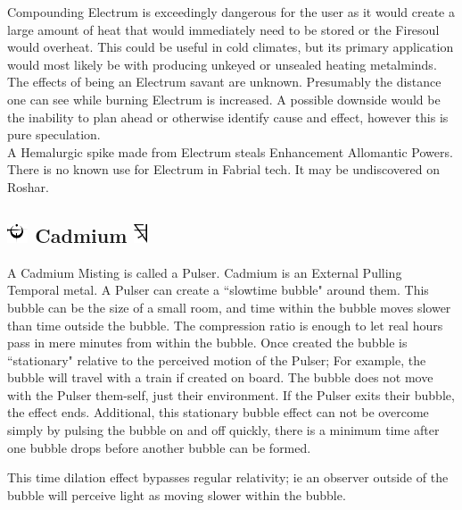 \documentclass[conference]{IEEEtran}
\begin{document}
Compounding Electrum is exceedingly dangerous for the user as it would create a large amount of heat that would immediately need to be stored or the Firesoul would overheat.\cite{fire-pound}  This could be useful in cold climates, but its primary application would most likely be with producing unkeyed or unsealed heating metalminds.\\

The effects of being an Electrum savant are unknown.  Presumably the distance one can see while burning Electrum is increased.  A possible downside would be the inability to plan ahead or otherwise identify cause and effect, however this is pure speculation.\\

A Hemalurgic spike made from Electrum steals Enhancement Allomantic Powers.\cite{HE-TB}\\

There is no known use for Electrum in Fabrial tech.  It may be undiscovered on Roshar.
\subsection*{\includegraphics[height=1em]{images/Cadmium.png}  Cadmium \includegraphics[height=1em]{images/Cadmium_(Feruchemy).png}}
A Cadmium Misting is called a Pulser.\cite{ARS}  Cadmium is an External Pulling Temporal metal.\cite{AL-TB}  A Pulser can create a ``slowtime bubble" around them.\cite{ARS}  This bubble can be the size of a small room,\cite{BoM-CH17}\cite{AoL-CH19} and time within the bubble moves slower than time outside the bubble.\cite{ARS}  The compression ratio is enough to let real hours pass in mere minutes from within the bubble.\cite{AoL-CH19}  Once created the bubble is ``stationary" relative to the perceived motion of the Pulser; For example, the bubble will travel with a train if created on board.\cite{BoM-CH8}  The bubble does not move with the Pulser them-self, just their environment.\cite{BoM-CH17}  If the Pulser exits their bubble, the effect ends.\cite{BoM-CH17}  Additional, this stationary bubble effect can not be overcome simply by pulsing the bubble on and off quickly, there is a minimum time after one bubble drops before another bubble can be formed.\cite{AoL-CH6}  

This time dilation effect bypasses regular relativity; ie an observer outside of the bubble will perceive light as moving slower within the bubble.
\end{document}
